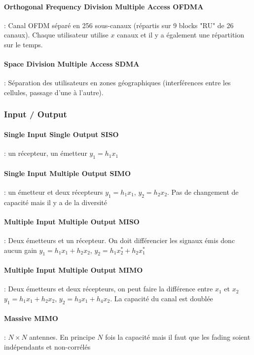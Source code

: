 \documentclass[resume]{subfiles}
\begin{document}
\paragraph{Orthogonal Frequency Division Multiple Access OFDMA} : Canal OFDM séparé en 256 sous-canaux (répartis sur 9 blocks "RU" de 26 canaux). Chaque utilisateur utilise $x$ canaux et il y a également une répartition sur le temps.
\paragraph{Space Division Multiple Access SDMA} : Séparation des utilisateurs en zones géographiques (interférences entre les cellules, passage d'une à l'autre).
\subsubsection{Input / Output}
\paragraph{Single Input Single Output SISO} : un récepteur, un émetteur $y_1=h_1x_1$
\paragraph{Single Input Multiple Output SIMO} : un émetteur et deux récepteurs $y_1=h_1x_1$, $y_2=h_2x_2$. Pas de changement de capacité mais il y a de la diversité
\paragraph{Multiple Input Multiple Output MISO} : Deux émetteurs et un récepteur. On doit différencier les signaux émis donc aucun gain $y_1=h_1x_1+h_2x_2$, $y_2=h_1x_2^\ast+h_2x_1^\ast$
\paragraph{Multiple Input Multiple Output MIMO} : Deux émetteurs et deux récepteurs, on peut faire la différence entre $x_1$ et $x_2$ $y_1=h_1x_1+h_2x_2$, $y_2=h_3x_1+h_4x_2$. La capacité du canal est doublée
\paragraph{Massive MIMO} : $N\times N$ antennes. En principe $N$ fois la capacité mais il faut que les fading soient indépendants et non-corrélés
\end{document}
